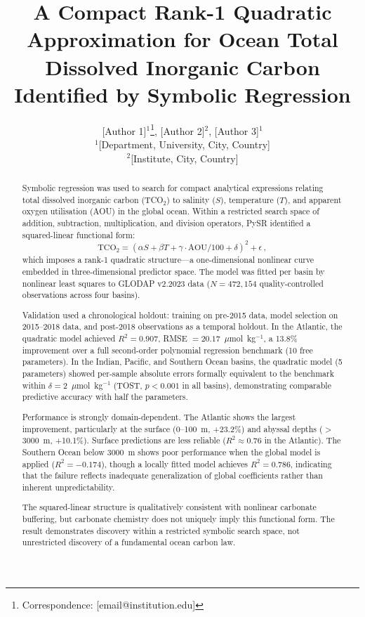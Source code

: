 \documentclass[12pt,a4paper]{article}
\title{A Compact Rank-1 Quadratic Approximation for Ocean Total Dissolved Inorganic Carbon Identified by Symbolic Regression}
\author{
[Author 1]$^{1}$\thanks{Correspondence: [email@institution.edu]}, [Author 2]$^{2}$, [Author 3]$^{1}$\\
\small $^{1}$[Department, University, City, Country]\\
\small $^{2}$[Institute, City, Country]
}
\date{}
\begin{document}
\maketitle

\begin{abstract}
Symbolic regression was used to search for compact analytical expressions relating total dissolved inorganic carbon (TCO$_2$) to salinity ($S$), temperature ($T$), and apparent oxygen utilisation (AOU) in the global ocean. Within a restricted search space of addition, subtraction, multiplication, and division operators, PySR identified a squared-linear functional form:
\begin{equation*}
\text{TCO}_2 = (\alpha S + \beta T + \gamma \cdot \text{AOU}/100 + \delta)^2 + \epsilon\,,
\end{equation*}
which imposes a rank-1 quadratic structure---a one-dimensional nonlinear curve embedded in three-dimensional predictor space. The model was fitted per basin by nonlinear least squares to GLODAP v2.2023 data ($N = 472{,}154$ quality-controlled observations across four basins).

Validation used a chronological holdout: training on pre-2015 data, model selection on 2015--2018 data, and post-2018 observations as a temporal holdout. In the Atlantic, the quadratic model achieved $R^2 = 0.907$, RMSE $= 20.17$~$\mu$mol~kg$^{-1}$, a 13.8\% improvement over a full second-order polynomial regression benchmark (10 free parameters). In the Indian, Pacific, and Southern Ocean basins, the quadratic model (5 parameters) showed per-sample absolute errors formally equivalent to the benchmark within $\delta = 2$~$\mu$mol~kg$^{-1}$ (TOST, $p < 0.001$ in all basins), demonstrating comparable predictive accuracy with half the parameters.

Performance is strongly domain-dependent. The Atlantic shows the largest improvement, particularly at the surface (0--100~m, +23.2\%) and abyssal depths ($>$3000~m, +10.1\%). Surface predictions are less reliable ($R^2 \approx 0.76$ in the Atlantic). The Southern Ocean below 3000~m shows poor performance when the global model is applied ($R^2 = -0.174$), though a locally fitted model achieves $R^2 = 0.786$, indicating that the failure reflects inadequate generalization of global coefficients rather than inherent unpredictability.

The squared-linear structure is qualitatively consistent with nonlinear carbonate buffering, but carbonate chemistry does not uniquely imply this functional form. The result demonstrates discovery within a restricted symbolic search space, not unrestricted discovery of a fundamental ocean carbon law.
\end{abstract}
\end{document}
